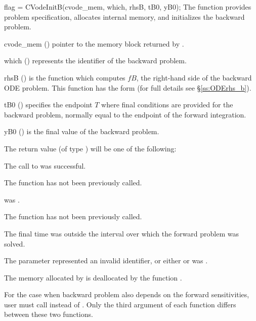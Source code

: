 {
  flag = CVodeInitB(cvode\_mem, which, rhsB, tB0, yB0);
}
{
  The function  provides problem specification, allocates internal memory, 
  and initializes the backward problem.
}
{
  \begin{args}
  \item[cvode\_mem] ()
    pointer to the {\cvodes} memory block returned by .
  \item[which] ()
    represents the identifier of the backward problem.
  \item[rhsB] ()
    is the {\C} function which computes $fB$, the right-hand side of the 
    backward ODE problem. This function has the form 
     (for full details see \S\ref{ss:ODErhs_b}).
  \item[tB0] ()
    specifies the endpoint $T$ where final conditions are provided for the 
    backward problem, normally equal to the endpoint of the forward integration.

  \item[yB0] ()
    is the final value of the backward problem. 
  \end{args}
}
{
  The return value  (of type ) will be one of the following:
  \begin{args}
  \item[\Id{CV\_SUCCESS}]
    The call to  was successful.
  \item[\Id{CV\_NO\_MALLOC}]
    The function  has not been previously called.
  \item[\Id{CV\_MEM\_NULL}]
     was .
  \item[\Id{CV\_NO\_ADJ}]
    The function  has not been previously called.
  \item[\Id{CV\_BAD\_TB0}]
    The final time  was outside the interval over which the forward problem
    was solved.
  \item[\Id{CV\_ILL\_INPUT}]
    The parameter  represented an invalid identifier, or either
     or  was .
  \end{args}
}
{
  The memory allocated by  is deallocated by the function 
  .
}

For the case when backward problem also depends on the forward
sensitivities, user must call  instead of .
Only the third argument of each function differs between these two
functions.

